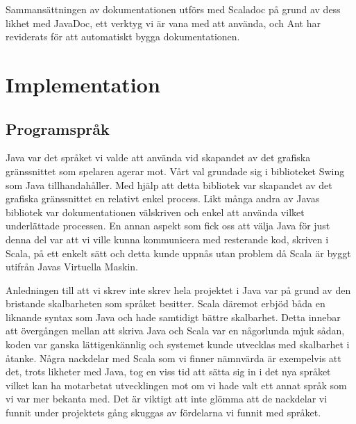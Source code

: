 \documentclass[a4paper]{article}
\begin{document}
Sammansättningen av dokumentationen utförs med Scaladoc på grund av dess likhet med JavaDoc, ett verktyg vi är vana med att använda, och Ant har reviderats för att automatiskt 
bygga dokumentationen.

\section{Implementation}

\subsection{Programspråk}
Java var det språket vi valde att använda vid skapandet av det grafiska gränssnittet som spelaren agerar mot. Vårt val grundade sig i biblioteket Swing som Java tillhandahåller. 
Med hjälp att detta bibliotek var skapandet av det grafiska gränssnittet en relativt enkel process. Likt många andra av Javas bibliotek var dokumentationen välskriven och enkel 
att använda vilket underlättade processen. En annan aspekt som fick oss att välja Java för just denna del var att vi ville kunna kommunicera med resterande kod, skriven i Scala, 
på ett enkelt sätt och detta kunde uppnås utan problem då Scala är byggt utifrån Javas Virtuella Maskin. 

Anledningen till att vi skrev inte skrev hela projektet i Java var på grund av den bristande skalbarheten som språket besitter. Scala däremot erbjöd båda en liknande syntax som 
Java och hade samtidigt bättre skalbarhet. Detta innebar att övergången mellan att skriva Java och Scala var en någorlunda mjuk sådan, koden var ganska lättigenkännlig och systemet 
kunde utvecklas med skalbarhet i åtanke. Några nackdelar med Scala som vi finner nämnvärda är exempelvis att det, trots likheter med Java, tog en viss tid att sätta sig in i det nya 
språket vilket kan ha motarbetat utvecklingen mot om vi hade valt ett annat språk som vi var mer bekanta med. Det är viktigt att inte glömma att de nackdelar vi funnit under 
projektets gång skuggas av fördelarna vi funnit med språket.
\end{document}
